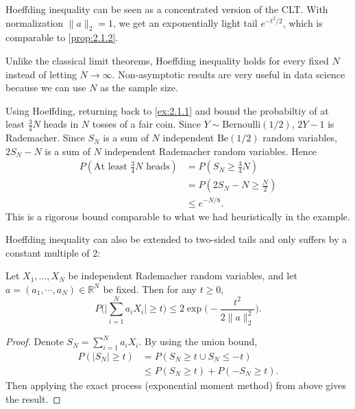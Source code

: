 \begin{remark}
\label{rmk:2.2.2}
Hoeffding inequality can be seen as a concentrated version of the CLT. With normalization $\|a\|_2 = 1$, 
we get an exponentially light tail $e^{-t^2 / 2}$, which is comparable to \cref{prop:2.1.2}.
\end{remark}

\begin{remark}
\label{rmk:2.2.3}
Unlike the classical limit theorems, Hoeffding inequality holds for every fixed $N$ instead of letting 
$N \to \infty$. Non-asymptotic results are very useful in data science because we can use $N$ as the 
sample size.
\end{remark}

\begin{remark}
\label{remark:2.2.4}
Using Hoeffding, returning back to \cref{ex:2.1.1} and bound the probabiltiy of at least $\frac{3}{4}N$ 
heads in $N$ tosses of a fair coin. Since $Y \sim \text{Bernoulli}(1/2)$, $2Y - 1$ is Rademacher. Since 
$S_N$ is a sum of $N$ independent $\text{Be}(1/2)$ random variables, $2S_N - N$ is a sum of $N$ 
independent Rademacher random variables. Hence 
\begin{align*}
	P(\text{At least } \frac{3}{4}N \text{ heads}) 
	&= P(S_N \geq \frac{3}{4}N) \\
	&= P(2S_N - N \geq \frac{N}{2}) \\
	&\leq e^{-N/8}.
\end{align*}
This is a rigorous bound comparable to what we had heuristically in the example.
\end{remark}

Hoeffding inequality can also be extended to two-sided tails and only suffers by a constant multiple 
of 2: 
\begin{theorem}
\label{thm:2.2.5}
Let $X_1, \dots, X_N$ be independent Rademacher random 
variables, and let $a = (a_1, \cdots, a_N) \in \mathbb{R}^N$ be fixed. Then for any $t \geq 0$, 
\[ P \biggl( \bigg| \sum_{i = 1}^{N} a_iX_i \bigg| \geq t \biggr) 
\leq 2\exp{\biggl( -\frac{t^2}{2\|a\|_2^2} \biggr)}. \]
\end{theorem}

\begin{proof}
Denote $S_N = \sum_{i = 1}^{N} a_iX_i$. By using the union bound,
\begin{align*}
	P(|S_N| \geq t) 
	&= P(S_N \geq t \cup S_N \leq -t) \\
	&\leq P(S_N \geq t) + P(-S_N \geq t).
\end{align*}
Then applying the exact process (exponential moment method) from above gives the result.
\end{proof}

